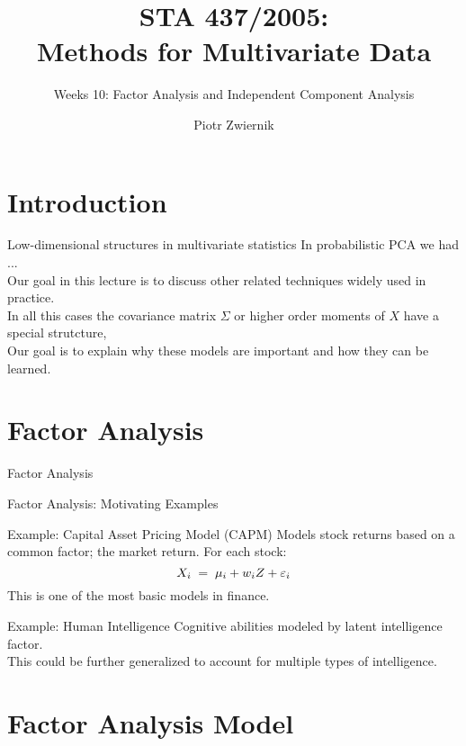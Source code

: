 \documentclass[11pt,handout,aspectratio=169]{beamer}
\title[STA437-Week1]{STA 437/2005: \\ Methods for Multivariate Data}
\subtitle[]{Weeks 10: Factor Analysis and Independent Component Analysis}
\author[Piotr Zwiernik]{Piotr Zwiernik}
\institute[UofT]{University of Toronto}
\date{}
\begin{document}
\maketitle
\section{Introduction}
\begin{frame}{Low-dimensional structures in multivariate statistics}
	In probabilistic PCA we had ...\\[5mm]
	
	Our goal in this lecture is to discuss other related techniques widely used in practice.\\[5mm]
	In all this cases the covariance matrix $\Sigma$ or higher order moments of $X$ have a special strutcture,  \\[5mm]
	Our goal is to explain why these models are important and how they can be learned.
\end{frame}

\section{Factor Analysis }

\begin{frame}{}
	\begin{center}
		{\Huge \alert{Factor Analysis}}
	\end{center}
\end{frame}

\begin{frame}{Factor Analysis: Motivating Examples}
\begin{block}{Example: Capital Asset Pricing Model (CAPM)}
	Models stock returns based on a common factor; the \alert{market return}. For each stock:
	\[ X_i \;=\; \mu_i + w_i Z + \varepsilon_i \]
This is one of the most basic models in finance.
\end{block}
\begin{alertblock}{Example: Human Intelligence}
	Cognitive abilities modeled by latent \alert{intelligence factor}.\\[3mm]
	This could be further generalized to account for multiple types of intelligence.
\end{alertblock}
\end{frame}

\section{Factor Analysis Model}
\end{document}
